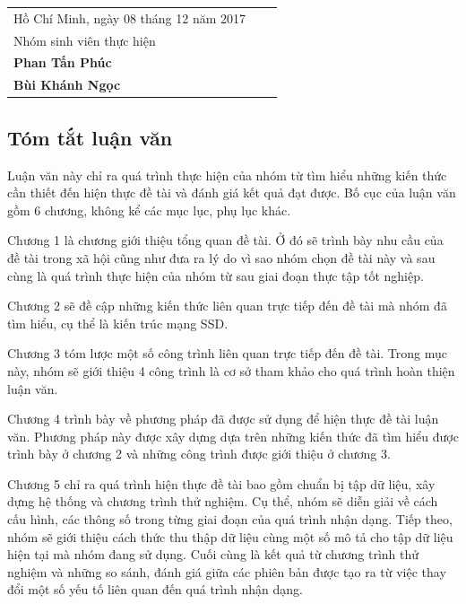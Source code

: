 \documentclass[a4paper]{article}
\theoremstyle{definition}
\begin{document}
	\begin{table}[h]
		\begin{tabular}{lll}
			\hspace{8cm} Hồ Chí Minh, ngày 08 tháng 12 năm 2017\\
			\hspace{10cm}Nhóm sinh viên thực hiện\\
			\hspace{10.5cm}\textbf{Phan Tấn Phúc}\\
			\hspace{10.5cm}\textbf{Bùi Khánh Ngọc}
		\end{tabular}
	\end{table}
	
	\newpage
	\subsection*{Tóm tắt luận văn}
	
	Luận văn  này chỉ ra quá trình thực hiện của nhóm từ tìm hiểu những kiến thức cần thiết đến hiện thực đề tài và đánh giá kết quả đạt được. Bố cục của luận văn gồm 6 chương, không kể các mục lục, phụ lục khác. 
	
	Chương 1 là chương giới thiệu tổng quan đề tài. Ở đó sẽ trình bày nhu cầu của đề tài trong xã hội cũng như đưa ra lý do vì sao nhóm chọn đề tài này và sau cùng là quá trình thực hiện của nhóm từ sau giai đoạn thực tập tốt nghiệp.
	
	Chương 2 sẽ đề cập những kiến thức liên quan trực tiếp đến đề tài mà nhóm đã tìm hiểu, cụ thể là kiến trúc mạng SSD.
	
	Chương 3 tóm lược một số công trình liên quan trực tiếp đến đề tài. Trong mục này, nhóm sẽ giới thiệu 4 công trình là cơ sở tham khảo cho quá trình hoàn thiện luận văn. 
	
	Chương 4 trình bày về phương pháp đã được sử dụng để hiện thực đề tài luận văn. Phương pháp này được xây dựng dựa trên những kiến thức đã tìm hiểu được trình bày ở chương 2 và những công trình được giới thiệu ở chương 3.
	
	Chương 5 chỉ ra quá trình hiện thực đề tài bao gồm chuẩn bị tập dữ liệu, xây dựng hệ thống và chương trình thử nghiệm. Cụ thể, nhóm sẽ diễn giải về cách cấu hình, các thông số trong từng giai đoạn của quá trình nhận dạng. Tiếp theo, nhóm sẽ giới thiệu cách thức thu thập dữ liệu cùng một số mô tả cho tập dữ liệu hiện tại mà nhóm đang sử dụng. Cuối cùng là kết quả từ chương trình thử nghiệm và những so sánh, đánh giá giữa các phiên bản được tạo ra từ việc thay đổi một số yếu tố liên quan đến quá trình nhận dạng. 
	
\end{document}
